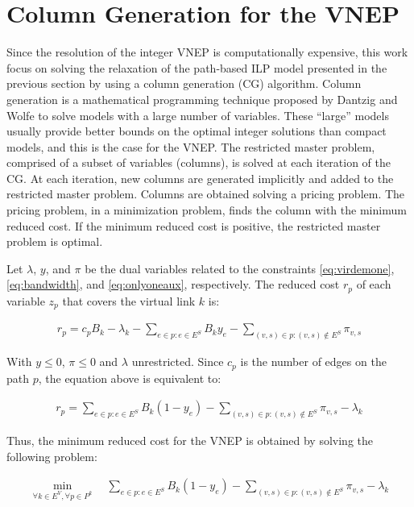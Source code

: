 \documentclass[12pt]{article}
\begin{document}
\section{Column Generation for the VNEP}
\label{sec:CG}

Since the resolution of the integer VNEP is computationally expensive, 
this work focus on solving the relaxation of the path-based ILP model presented in the previous section by using a column generation (CG) algorithm.
Column generation is a mathematical programming technique proposed by Dantzig and Wolfe \cite{Dantzig:1960} 
to solve models with a large number of variables.
These ``large'' models usually provide better bounds on the optimal integer solutions than compact models, and this is the case for the VNEP.
The restricted master problem, comprised of a subset of variables (columns), is solved at each iteration of the CG.
At each iteration, new columns are generated implicitly and added to the restricted master problem.
Columns are obtained solving a pricing problem.
The pricing problem, in a minimization problem, finds the column with the minimum reduced cost.
If the minimum reduced cost is positive, the restricted master problem is optimal.

Let $\lambda$, $y$, and  $\pi$ be the dual variables related to the constraints \eqref{eq:virdemone}, \eqref{eq:bandwidth}, and \eqref{eq:onlyoneaux}, respectively. The reduced cost $r_{p}$ of each variable $z_{p}$ that covers the virtual link $k$ is:

\begin{align}
  r_{p} = c_{p} B_{k} - \lambda_{k} - \sum\limits_{e \in p : e \in E^S} B_{k} y_{e}  - \sum\limits_{(v,s) \in p : (v,s) \notin E^S} \pi_{v,s}  \nonumber
\end{align}

With $y \leq 0$, $\pi \leq 0$ and $\lambda$ unrestricted. Since $c_p$ is the number of edges on the path $p$, the equation above is equivalent to:

\begin{align}
  r_{p} = \sum\limits_{e \in p : e \in E^S} B_{k} (1 - y_{e}) - \sum\limits_{(v,s) \in p : (v,s) \notin E^S} \pi_{v,s} - \lambda_{k} \nonumber
\end{align}

Thus, the minimum reduced cost for the VNEP is obtained by solving the following problem:

\begin{align}
  \min_{ \forall k \in E^{V}, \forall p \in P^{k}}  \quad  \sum\limits_{e \in p : e \in E^S} B_{k} (1 - y_{e}) - \sum\limits_{(v,s) \in p : (v,s) \notin E^S} \pi_{v,s}-\lambda_{k} \nonumber
\end{align}
\end{document}

